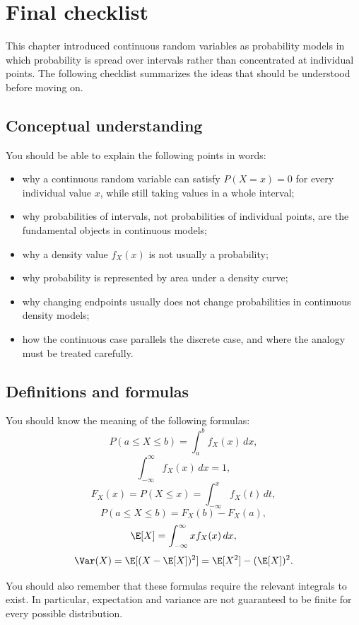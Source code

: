\section{Final checklist}

This chapter introduced continuous random variables as probability models in
which probability is spread over intervals rather than concentrated at individual
points. The following checklist summarizes the ideas that should be understood
before moving on.

\subsection*{Conceptual understanding}

You should be able to explain the following points in words:
\begin{itemize}
    \item why a continuous random variable can satisfy \(P(X=x)=0\) for every
    individual value \(x\), while still taking values in a whole interval;
    \item why probabilities of intervals, not probabilities of individual
    points, are the fundamental objects in continuous models;
    \item why a density value \(f_X(x)\) is not usually a probability;
    \item why probability is represented by area under a density curve;
    \item why changing endpoints usually does not change probabilities in
    continuous density models;
    \item how the continuous case parallels the discrete case, and where the
    analogy must be treated carefully.
\end{itemize}

\subsection*{Definitions and formulas}

You should know the meaning of the following formulas:
\[
P(a\leq X\leq b)=\int_a^b f_X(x)\,dx,
\]
\[
\int_{-\infty}^{\infty}f_X(x)\,dx=1,
\]
\[
F_X(x)=P(X\leq x)=\int_{-\infty}^x f_X(t)\,dt,
\]
\[
P(a\leq X\leq b)=F_X(b)-F_X(a),
\]
\[
\E[X]=\int_{-\infty}^{\infty}x f_X(x)\,dx,
\]
\[
\Var(X)=\E[(X-\E[X])^2]=\E[X^2]-(\E[X])^2.
\]

You should also remember that these formulas require the relevant integrals to
exist. In particular, expectation and variance are not guaranteed to be finite
for every possible distribution.

